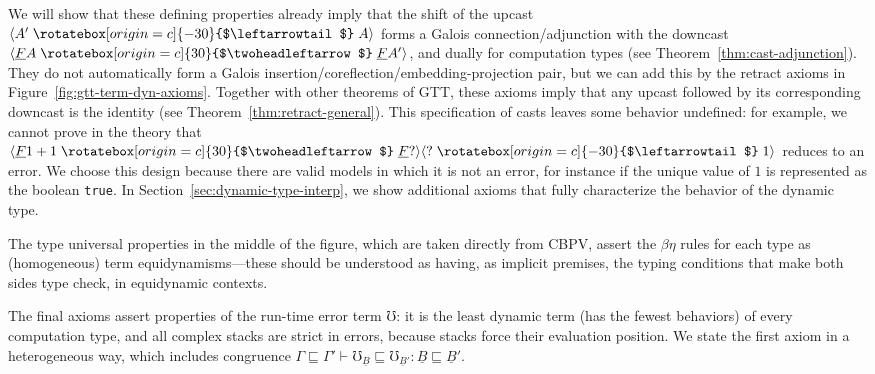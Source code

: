 \documentclass[acmsmall,screen,12pt]{acmart}
\renewcommand{\u}{\underline}
\newcommand{\ltdyn}{\sqsubseteq}
\newcommand{\dynv}{{?}}
\newcommand{\uarrow}{\mathrel{\rotatebox[origin=c]{-30}{$\leftarrowtail$}}}
\newcommand{\darrow}{\mathrel{\rotatebox[origin=c]{30}{$\twoheadleftarrow$}}}
\newcommand{\upcast}[2]{\langle{#2}\uarrow{#1}\rangle}
\newcommand{\dncast}[2]{\langle{#1}\darrow{#2}\rangle}
\newcommand{\err}{\mho}
\begin{document}
We will show that these defining properties already imply that the shift
of the upcast $\upcast{A}{A'}$ forms a Galois connection/adjunction with
the downcast $\dncast{\u F A}{\u F A'}$, and dually for computation
types (see Theorem~\ref{thm:cast-adjunction}).  They do not
automatically form a Galois insertion/coreflection/embedding-projection
pair, but we can add this by the retract axioms in
Figure~\ref{fig:gtt-term-dyn-axioms}.  Together with other theorems of
GTT, these axioms imply that any upcast followed by its corresponding
downcast is the identity (see Theorem~\ref{thm:retract-general}).  This
specification of casts leaves some behavior undefined: for example, we
cannot prove in the theory that $\dncast{\u F 1+1}{\u
  F\dynv}\upcast{1}{\dynv}$ reduces to an error.  We choose this design
because there are valid models in which it is not an error, for instance
if the unique value of $1$ is represented as the boolean \texttt{true}. In
Section~\ref{sec:dynamic-type-interp}, we show additional axioms that
fully characterize the behavior of the dynamic type.

The type universal properties in the middle of the figure, which are
taken directly from CBPV, assert the $\beta\eta$ rules for each type as
(homogeneous) term equidynamisms---these should be understood as having,
as implicit premises, the typing conditions that make both sides type
check, in equidynamic contexts.

The final axioms assert properties of the run-time error term $\err$: it
is the least dynamic term (has the fewest behaviors) of every
computation type, and all complex stacks are strict in errors, because
stacks force their evaluation position.  We state the first axiom in a
heterogeneous way, which includes congruence $\Gamma \ltdyn \Gamma'
\vdash \err_{\u B} \ltdyn \err_{\u B'} : \u B \ltdyn \u B'$.
\end{document}
